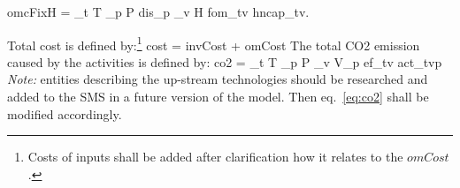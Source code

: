 \documentclass[a4paper,12pt]{article}
\begin{document}
		omcFixH = \sum_{t \in T} \sum_{p \in P} dis_p \sum_{v \in H}
			fom_{tv} \cdot hncap_{tv}.
	\ee
\begin{comment}
\inum Each activity requires the corresponding input resources.
	The following relation defines the inputs of the corresponding commodities
	required as inputs by all technologies:
	\be
		actInp_{cp} = \sum_{t \in T} \sum_{v \in V_p} inp_{ctv} \cdot act_{tvp},
		\quad  c \in C_i,\; p \in P
	\ee
\inum Costs of externally provided inputs are defined by:
	\be
		extCost = \sum_{c \in C_i} \sum_{p \in P} extP_{cp} \cdot actInp_{cp}
	\ee
\end{comment}
\inum Total cost is defined by:\footnote{Costs of inputs shall be added after
	clarification how it relates to the $omCost$.}
	\be
		cost = invCost + omCost
	\ee
\inum The total CO2 emission caused by the activities is defined by:
	\be\label{eq:co2}
		co2 = \sum_{t \in T} \sum_{p \in P} \sum_{v \in V_p} ef_{tv} \cdot act_{tvp}
	\ee
\etl
{\em Note:} entities describing the up-stream technologies should be
researched and added to the SMS in a future version of the model.
Then eq.~\eqref{eq:co2} shall be modified accordingly.
\end{document}
